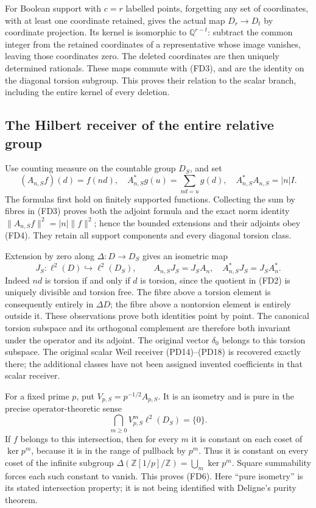 \documentclass[11pt,a4paper]{article}
\theoremstyle{definition}\newtheorem{definition}[theorem]{Definition}
\begin{document}
For Boolean support with $c=r$ labelled points, forgetting any set of
coordinates, with at least one coordinate retained, gives the actual
map $D_r\to D_t$ by coordinate projection. Its kernel is isomorphic
to $\mathbb Q^{r-t}$: subtract the common integer from the retained
coordinates of a representative whose image vanishes, leaving those
coordinates zero. The deleted coordinates are then uniquely determined
rationals. These maps commute with (FD3), and are the identity on the
diagonal torsion subgroup. This proves their relation to the scalar
branch, including the entire kernel of every deletion.

\subsection{The Hilbert receiver of the entire relative group}
Use counting measure on the countable group $D_S$, and set
\[
 (A_{n,S}f)(d)=f(nd),\quad
 A_{n,S}^*g(u)=\sum_{nd=u}g(d),\quad
 A_{n,S}^*A_{n,S}=|n|I.
 \tag{FD4}
\]
The formulas first hold on finitely supported functions. Collecting the
sum by fibres in (FD3) proves both the adjoint formula and the exact
norm identity $\|A_{n,S}f\|^2=|n|\|f\|^2$; hence the bounded
extensions and their adjoints obey (FD4). They retain all support
components and every diagonal torsion class.

Extension by zero along $\Delta:D\to D_S$ gives an isometric map
\[
 J_S:\ell^2(D)\hookrightarrow\ell^2(D_S),\qquad
 A_{n,S}J_S=J_S A_n,\quad A_{n,S}^*J_S=J_S A_n^*.
 \tag{FD5}
\]
Indeed $nd$ is torsion if and only if $d$ is torsion, since the quotient
in (FD2) is uniquely divisible and torsion free. The fibre above a
torsion element is consequently entirely in $\Delta D$; the fibre
above a nontorsion element is entirely outside it. These observations
prove both identities point by point. The canonical torsion subspace
and its orthogonal complement are therefore both invariant under the
operator and its adjoint. The original vector $\delta_{0}$ belongs to
this torsion subspace. The original scalar Weil receiver (PD14)--(PD18)
is recovered exactly there; the additional classes have not been
assigned invented coefficients in that scalar receiver.

For a fixed prime $p$, put $V_{p,S}=p^{-1/2}A_{p,S}$. It is an
isometry and is pure in the precise operator-theoretic sense
\[
 \bigcap_{m\ge0}V_{p,S}^m\ell^2(D_S)=\{0\}.
 \tag{FD6}
\]
If $f$ belongs to this intersection, then for every $m$ it is constant
on each coset of $\ker p^m$, because it is in the range of pullback by
$p^m$. Thus it is constant on every coset of the infinite subgroup
$\Delta(\mathbb Z[1/p]/\mathbb Z)=\bigcup_m\ker p^m$.
Square summability forces each such constant to vanish. This proves
(FD6). Here ``pure isometry'' is its stated intersection property;
it is not being identified with Deligne's purity theorem.
\end{document}
